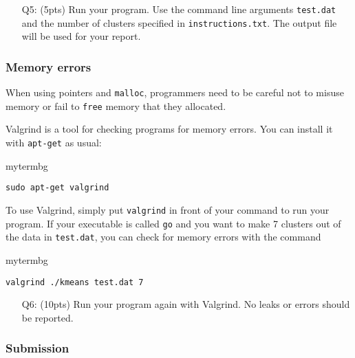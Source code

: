 \begin{itemize}
    \item[Q5:] (5pts) Run your program.
    Use the command line arguments \texttt{test.dat} and the number of clusters specified in \texttt{instructions.txt}.
    The output file will be used for your report.
\end{itemize}

\subsubsection*{Memory errors}

When using pointers and \texttt{malloc},
programmers need to be careful not to misuse memory
or fail to \texttt{free} memory that they allocated.

Valgrind is a tool for checking programs for memory errors.
You can install it with \texttt{apt-get} as usual:
\begin{tsession}{mytermbg}
\begin{verbatim}
sudo apt-get valgrind
\end{verbatim}
\end{tsession}
To use Valgrind, simply put \texttt{valgrind} in front of your command to run your program.
If your executable is called \texttt{go} and you want to make 7 clusters out of the data in \texttt{test.dat},
you can check for memory errors with the command
\begin{tsession}{mytermbg}
\begin{verbatim}
valgrind ./kmeans test.dat 7
\end{verbatim}
\end{tsession}

\begin{itemize}
    \item[Q6:] (10pts) Run your program again with Valgrind.
    No leaks or errors should be reported.
\end{itemize}

\subsubsection*{Submission}

